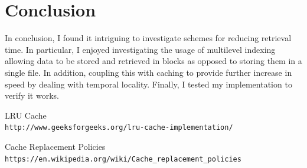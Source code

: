 \documentclass{article}
\begin{document}
\section{Conclusion}

In conclusion, I found it intriguing to investigate schemes for reducing retrieval time. In particular, I enjoyed investigating the usage of multilevel indexing allowing data to be stored and retrieved in blocks as opposed to storing them in a single file. In addition, coupling this with caching to provide further increase in speed by dealing with temporal locality. Finally, I tested my implementation to verify it works.

\begin{thebibliography}{1}

  LRU Cache
  \\\texttt{http://www.geeksforgeeks.org/lru-cache-implementation/}

  Cache Replacement Policies
  \\\texttt{https://en.wikipedia.org/wiki/Cache\_replacement\_policies}

\end{thebibliography}
\end{document}
